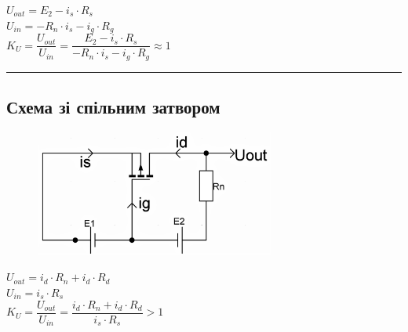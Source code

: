 \documentclass[14pt,a4paper]{scrartcl}
\begin{document}
\begin{center}
$U_{out}=E_2-i_s\cdot{R_s}$\\[0.5cm]

$U_{in}=-R_n\cdot{i_s}-i_g\cdot{R_g}$\\[0.5cm]

$K_U=\dfrac{U_{out}}{U_{in}}=\dfrac{E_2-i_s\cdot{R_s}}{-R_n\cdot{i_s}-i_g\cdot{R_g}}\approx 1$
\end{center}
\medskip\hrule\medskip
\newpage

\subsection{Схема зі спільним затвором}
\begin{figure}[!h]\TopFloatBoxes\CenterFloatBoxes
{}
{\includegraphics[width=0.7\textwidth]{comgate}}
 \end{figure}


\begin{center}
$U_{out}=i_d\cdot{R_n}+i_d\cdot{R_d}$\\[0.5cm]

$U_{in}=i_s\cdot{R_s}$\\[0.5cm]

$K_U=\dfrac{U_{out}}{U_{in}}=\dfrac{i_d\cdot{R_n}+i_d\cdot{R_d}}{i_s\cdot{R_s}}>1$
\end{center}









\end{document}
